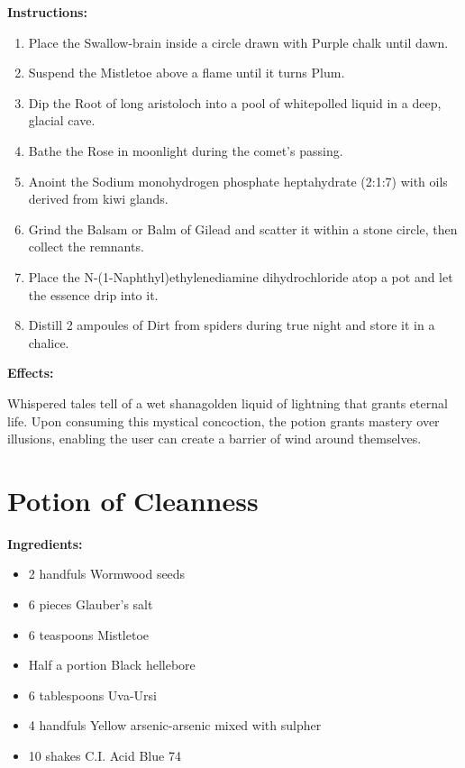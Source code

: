 \documentclass{article}
\begin{document}
\textbf{Instructions:}

\begin{enumerate}
  \item Place the Swallow-brain inside a circle drawn with Purple chalk until dawn.
  \item Suspend the Mistletoe above a flame until it turns Plum.
  \item Dip the Root of  long aristoloch into a pool of whitepolled liquid in a deep, glacial cave.
  \item Bathe the Rose in moonlight during the comet’s passing.
  \item Anoint the Sodium monohydrogen phosphate heptahydrate (2:1:7) with oils derived from kiwi glands.
  \item Grind the Balsam or Balm of Gilead and scatter it within a stone circle, then collect the remnants.
  \item Place the N-(1-Naphthyl)ethylenediamine dihydrochloride atop a pot and let the essence drip into it.
  \item Distill 2 ampoules of Dirt from spiders during true night and store it in a chalice.
\end{enumerate}

\textbf{Effects:}

Whispered tales tell of a wet shanagolden liquid of lightning that grants eternal life. Upon consuming this mystical concoction, the potion grants mastery over illusions, enabling the user can create a barrier of wind around themselves.

\newpage
\section*{Potion of Cleanness}

\textbf{Ingredients:}

\begin{itemize}
  \item 2 handfuls Wormwood seeds
  \item 6 pieces Glauber's salt
  \item 6 teaspoons Mistletoe
  \item Half a portion Black hellebore
  \item 6 tablespoons Uva-Ursi
  \item 4 handfuls Yellow arsenic-arsenic mixed with sulpher
  \item 10 shakes C.I. Acid Blue 74
\end{itemize}
\end{document}

